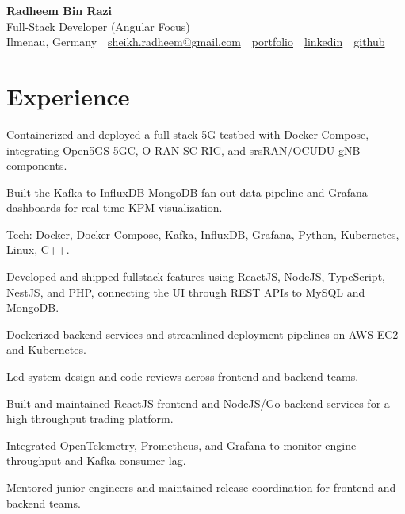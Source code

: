 \documentclass[10pt,a4paper]{resume}
\makeatletter
\newcommand{\Portfolio}{https://radheem.github.io/my-cv}
\newcommand{\PortfolioText}{portfolio}
\newcommand{\GitHub}{https://github.com/radheem}
\newcommand{\LinkedIn}{https://www.linkedin.com/in/radheem-razi}
\newcommand{\Email}{sheikh.radheem@gmail.com}
\makeatother
\begin{document}
\begin{center}
  {\huge\bfseries Radheem Bin Razi}\\[3pt]
  {\large Full-Stack Developer (Angular Focus)}\\[6pt]
  \small
  Ilmenau, Germany \,\textbar\,
  \href{mailto:\Email}{\Email} \,\textbar\,
  \href{\Portfolio}{\PortfolioText} \,\textbar\,
  \href{\LinkedIn}{linkedin} \,\textbar\,
  \href{\GitHub}{github}
\end{center}
\vspace{2pt}

\section{Experience}

\bullets
  \item Containerized and deployed a full-stack 5G testbed with Docker Compose, integrating Open5GS 5GC, O-RAN SC RIC, and srsRAN/OCUDU gNB components.
  \item Built the Kafka-to-InfluxDB-MongoDB fan-out data pipeline and Grafana dashboards for real-time KPM visualization.
  \item Tech: Docker, Docker Compose, Kafka, InfluxDB, Grafana, Python, Kubernetes, Linux, C++.
\bulletsend
\vspace{1.5pt}
\bullets
  \item Developed and shipped fullstack features using ReactJS, NodeJS, TypeScript, NestJS, and PHP, connecting the UI through REST APIs to MySQL and MongoDB.
  \item Dockerized backend services and streamlined deployment pipelines on AWS EC2 and Kubernetes.
  \item Led system design and code reviews across frontend and backend teams.
\bulletsend
\vspace{1.5pt}
\bullets
  \item Built and maintained ReactJS frontend and NodeJS/Go backend services for a high-throughput trading platform.
  \item Integrated OpenTelemetry, Prometheus, and Grafana to monitor engine throughput and Kafka consumer lag.
  \item Mentored junior engineers and maintained release coordination for frontend and backend teams.
\bulletsend
\vspace{1.5pt}
\end{document}
